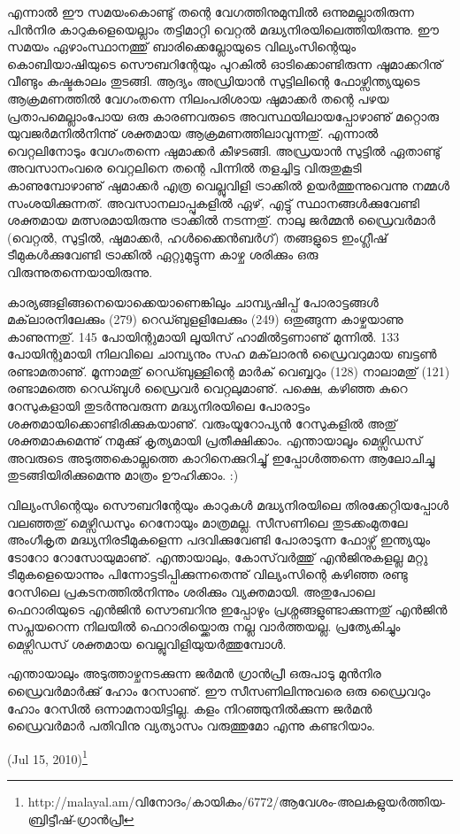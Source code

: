 എന്നാല്‍ ഈ സമയംകൊണ്ടു് തന്റെ വേഗത്തിനുമുമ്പില്‍ ഒന്നുമല്ലാതിരുന്ന പിന്‍നിര കാറുകളെയെല്ലാം തട്ടിമാറ്റി വെറ്റല്‍ 
മദ്ധ്യനിരയിലെത്തിയിരുന്നു. ഈ സമയം ഏഴാംസ്ഥാനത്തു് ബാരിക്കെല്ലോയുടെ വില്യംസിന്റെയും കൊബിയാഷിയുടെ സൌബറിന്റേയും 
പുറകില്‍ ഓടിക്കൊണ്ടിരുന്ന ഷൂമാക്കറിനു് വീണ്ടും കഷ്ടകാലം തുടങ്ങി. ആദ്യം അഡ്രിയാന്‍ സുട്ടിലിന്റെ ഫോഴ്സിന്ത്യയുടെ ആക്രമണത്തില്‍ 
വേഗംതന്നെ നിലംപരിശായ ഷുമാക്കര്‍ തന്റെ പഴയ പ്രതാപമെല്ലാംപോയ ഒരു കാരണവരുടെ അവസ്ഥയിലായപ്പോഴാണു് മറ്റൊരു
 യുവജര്‍മനില്‍നിന്നു് ശക്തമായ ആക്രമണത്തിലാവുന്നതു്. എന്നാല്‍ വെറ്റലിനോടും വേഗംതന്നെ ഷുമാക്കര്‍ കീഴടങ്ങി. അഡ്രയാന്‍ 
 സുട്ടില്‍ ഏതാണ്ടു് അവസാനംവരെ വെറ്റലിനെ തന്റെ പിന്നില്‍ തളച്ചിട്ട വിരുതുകൂടി കാണുമ്പോഴാണു് ഷുമാക്കര്‍ എത്ര വെല്ലുവിളി 
 ട്രാക്കില്‍ ഉയര്‍ത്തുന്നുവെന്നു നമ്മള്‍ സംശയിക്കുന്നത്. അവസാനലാപ്പുകളില്‍ ഏഴ്, എട്ടു് സ്ഥാനങ്ങള്‍ക്കുവേണ്ടി ശക്തമായ 
 മത്സരമായിരുന്നു ട്രാക്കില്‍ നടന്നതു്. നാലു ജര്‍മ്മന്‍ ഡ്രൈവര്‍മാര്‍ (വെറ്റല്‍, സുട്ടില്‍, ഷുമാക്കര്‍, ഹള്‍ക്കൈന്‍ബര്‍ഗ്) തങ്ങളുടെ ഇംഗ്ലീഷ് 
 ടീമുകള്‍ക്കുവേണ്ടി ട്രാക്കില്‍ ഏറ്റുമുട്ടുന്ന കാഴ്ച ശരിക്കും ഒരു വിരുന്നുതന്നെയായിരുന്നു.

കാര്യങ്ങളിങ്ങനെയൊക്കെയാണെങ്കിലും ചാമ്പ്യഷിപ്പ് പോരാട്ടങ്ങള്‍ മക്‌ലാരനിലേക്കും (279) റെഡ്ബുളളിലേക്കും (249) ഒതുങ്ങുന്ന 
കാഴ്ചയാണു കാണുന്നതു്. 145 പോയിന്റുമായി ലൂയിസ് ഹാമില്‍ട്ടണാണു് മുന്നില്‍. 133 പോയിന്റുമായി നിലവിലെ ചാമ്പ്യനും സഹ മക്‌ലാരന്‍ 
ഡ്രൈവറുമായ ബട്ടണ്‍ രണ്ടാമതാണു്. മൂന്നാമതു് റെഡ്ബുള്ളിന്റെ മാര്‍ക് വെബ്ബറും (128) നാലാമതു് (121) രണ്ടാമത്തെ റെഡ്ബുള്‍ 
ഡ്രൈവര്‍ വെറ്റലുമാണു്. പക്ഷെ, കഴിഞ്ഞ കുറെ റേസുകളായി തുടര്‍ന്നുവരുന്ന മദ്ധ്യനിരയിലെ പോരാട്ടം ശക്തമായിക്കൊണ്ടിരിക്കുകയാണു്.
 വരുംയൂറോപ്യന്‍ റേസുകളില്‍ അതു് ശക്തമാകുമെന്നു് നമുക്കു് കൃത്യമായി പ്രതീക്ഷിക്കാം. എന്തായാലൂം മെഴ്സിഡസ് അവരുടെ 
 അടുത്തകൊല്ലത്തെ കാറിനെക്കുറിച്ചു് ഇപ്പോള്‍ത്തന്നെ ആലോചിച്ചു തുടങ്ങിയിരിക്കുമെന്നു മാത്രം ഊഹിക്കാം. :)

വില്യംസിന്റെയും സൌബറിന്റേയും കാറുകള്‍ മദ്ധ്യനിരയിലെ തിരക്കേറ്റിയപ്പോള്‍ വലഞ്ഞതു് മെഴ്സിഡസും റെനോയും മാത്രമല്ല. 
സീസണിലെ തുടക്കംമുതലേ അംഗീകൃത മദ്ധ്യനിരടീമുകളെന്ന പദവിക്കുവേണ്ടി പോരാടുന്ന ഫോഴ്സ് ഇന്ത്യയും ടോറോ റോസോയുമാണു്. 
എന്തായാലും, കോസ്‌വര്‍ത്തു് എന്‍ജിനുകളല്ല മറ്റു ടീമുകളെയൊന്നും പിന്നോട്ടടിപ്പിക്കുന്നതെന്നു് വില്യംസിന്റെ കഴിഞ്ഞ രണ്ടു റേസിലെ 
പ്രകടനത്തില്‍നിന്നും ശരിക്കും വ്യക്തമായി. അതുപോലെ ഫെറാരിയുടെ എന്‍ജിന്‍ സൌബറിനു ഇപ്പോഴും പ്രശ്നങ്ങളുണ്ടാക്കുന്നതു് 
എന്‍ജിന്‍ സപ്ലയറെന്ന നിലയില്‍ ഫെറാരിയ്ക്കൊരു നല്ല വാര്‍ത്തയല്ല. പ്രത്യേകിച്ചും മെഴ്സിഡസ് ശക്തമായ വെല്ലുവിളിയുയര്‍ത്തുമ്പോള്‍.

എന്തായാലും അടുത്താഴ്ചനടക്കുന്ന ജര്‍മന്‍ ഗ്രാന്‍പ്രീ ഒരുപാടു മുന്‍നിര ഡ്രൈവര്‍മാര്‍ക്കു് ഹോം റേസാണു്. ഈ സീസണിലിന്നുവരെ 
ഒരു ഡ്രൈവറും ഹോം റേസില്‍ ഒന്നാമനായിട്ടില്ല. കളം നിറഞ്ഞുനില്‍ക്കുന്ന ജര്‍മന്‍ ഡ്രൈവര്‍മാര്‍ പതിവിനു വ്യത്യാസം വരുത്തുമോ 
എന്നു കണ്ടറിയാം.

(Jul 15, 2010)\footnote{http://malayal.am/വിനോദം/കായികം/6772/ആവേശം-അലകളുയര്‍ത്തിയ-ബ്രിട്ടീഷ്-ഗ്രാന്‍പ്രീ}
\newpage
